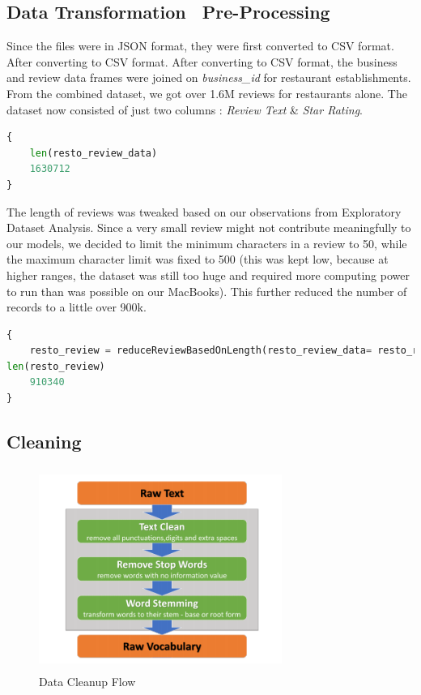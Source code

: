 \documentclass[paper=a4, fontsize=11pt]{scrartcl} %
\numberwithin{equation}{section} %
\numberwithin{figure}{section} %
\numberwithin{table}{section} %
\begin{document}
\subsection{Data Transformation \ Pre-Processing}
Since the files were in JSON format, they were first converted to CSV format. After converting to CSV format. After converting to CSV format, the business and review data frames were joined on \textit{business\_id} for restaurant establishments. From the combined dataset, we got over 1.6M reviews for restaurants alone. The dataset now consisted of just two columns : \textit{Review Text} \& \textit{Star Rating}. \\
\begin{lstlisting}[language=python]
{
  	len(resto_review_data)
  	1630712
}
\end{lstlisting}
The length of reviews was tweaked based on our observations from Exploratory Dataset Analysis. Since a very small review might not contribute meaningfully to our models, we decided to limit the minimum characters in a review to 50, while the maximum character limit was fixed to 500 (this was kept low, because at higher ranges, the dataset was still too huge and required more computing power to run than was possible on our MacBooks).
This further reduced the number of records to a little over 900k. \\
\begin{lstlisting}[language=python]
{
  	resto_review = reduceReviewBasedOnLength(resto_review_data= resto_review_data, minReviewLen=50, maxReviewLen=500)
len(resto_review)
  	910340
}
\end{lstlisting}
\subsection{Cleaning}

\begin{figure}
\centering
\includegraphics[width=300px, height = 250px]{DataPreprocessFlow.png}
\caption{Data Cleanup Flow}
\label{cleanup_diag}
\end{figure} 
\end{document}

